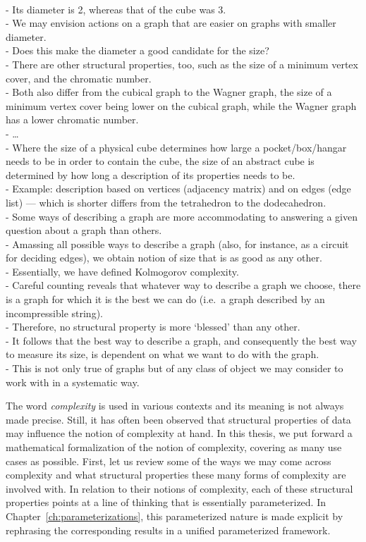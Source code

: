 {  \\- Its diameter is 2, whereas that of the cube was 3.
  \\- We may envision actions on a graph that are easier on graphs with smaller diameter.
  \\- Does this make the diameter a good candidate for the size?
  \\- There are other structural properties, too, such as the size of a minimum vertex cover, and the chromatic number.
  \\- Both also differ from the cubical graph to the Wagner graph, the size of a minimum vertex cover being lower on the cubical graph, while the Wagner graph has a lower chromatic number.
  \\- \ldots
  \\- Where the size of a physical cube determines how large a pocket/box/hangar needs to be in order to contain the cube, the size of an abstract cube is determined by how long a description of its properties needs to be.
  \\- Example: description based on vertices (adjacency matrix) and on edges (edge list) --- which is shorter differs from the tetrahedron to the dodecahedron.
  \\- Some ways of describing a graph are more accommodating to answering a given question about a graph than others.
  \\- Amassing all possible ways to describe a graph (also, for instance, as a circuit for deciding edges), we obtain notion of size that is as good as any other.
  \\- Essentially, we have defined Kolmogorov complexity.
  \\- Careful counting reveals that whatever way to describe a graph we choose, there is a graph for which it is the best we can do (i.e.~a graph described by an incompressible string).
  \\- Therefore, no structural property is more `blessed' than any other.
  \\- It follows that the best way to describe a graph, and consequently the best way to measure its size, is dependent on what we want to do with the graph.
  \\- This is not only true of graphs but of any class of object we may consider to work with in a systematic way.
}



The word \emph{complexity} is used in various contexts and its meaning is not always made precise.
Still, it has often been observed that structural properties of data may influence the notion of complexity at hand.
In this thesis, we put forward a mathematical formalization of the notion of complexity, covering as many use cases as possible.
First, let us review some of the ways we may come across complexity and what structural properties these many forms of complexity are involved with.
In relation to their notions of complexity, each of these structural properties points at a line of thinking that is essentially parameterized.
In Chapter~\ref{ch:parameterizations}, this parameterized nature is made explicit by rephrasing the corresponding results in a unified parameterized framework.

